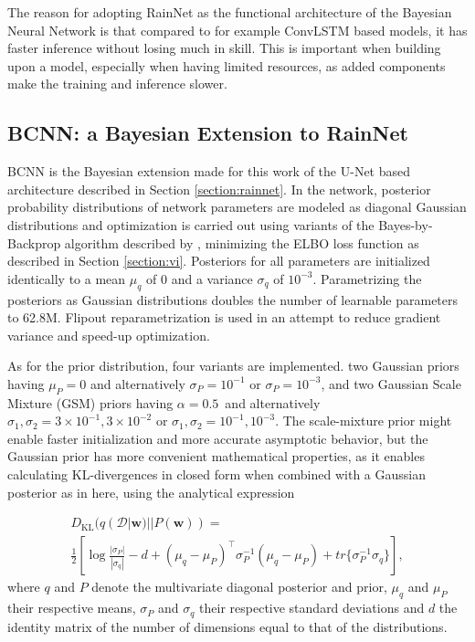 The reason for adopting RainNet as the functional architecture of the Bayesian Neural Network is that compared to for example ConvLSTM based models, it has faster inference without losing much in skill. This is important when building upon a model, especially when having limited resources, as added components make the training and inference slower. 


\subsection{BCNN: a Bayesian Extension to RainNet}

\label{section:bcnn}

BCNN is the Bayesian extension made for this work of the U-Net based architecture described in Section \ref{section:rainnet}. In the network, posterior probability distributions of network parameters are modeled as diagonal Gaussian distributions and optimization is carried out using variants of the Bayes-by-Backprop algorithm described by \citet{blundell_weight_2015}, minimizing the ELBO loss function as described in Section \ref{section:vi}. Posteriors for all parameters are initialized identically to a mean $\mu_q$ of 0 and a variance $\sigma_q$ of $10^{-3}$. Parametrizing the posteriors as Gaussian distributions doubles the number of learnable parameters to 62.8M. Flipout reparametrization \cite{wen_flipout_2018} is used in an attempt to reduce gradient variance and speed-up optimization. 

As for the prior distribution, four variants are implemented. two Gaussian priors having $\mu_P = 0$ and alternatively $\sigma_P = 10^{-1}$ or $\sigma_P = 10^{-3}$, and two Gaussian Scale Mixture (GSM) priors having $\alpha = 0.5$ and alternatively $\sigma_1, \sigma_2 = 3 \times 10^{-1}, 3 \times 10^{-2}$ or $\sigma_1, \sigma_2 = 10^{-1}, 10^{-3}$. The scale-mixture prior might enable faster initialization and more accurate asymptotic behavior, but the Gaussian prior has more convenient mathematical properties, as it enables calculating KL-divergences in closed form when combined with a Gaussian posterior as in here, using the analytical expression

\begin{multline}
D_{\text{KL}}(q(\mathcal{D}|\pmb{w}) || P(\pmb{w})) =\\
\frac{1}{2}\left[\log \frac{|\sigma_P|}{|\sigma_q|}
- d 
+ (\mu_q - \mu_P)^\top \sigma_P^{-1}(\mu_q - \mu_P)
+ tr\{\sigma_P^{-1}\sigma_q\}
\right],
\end{multline}
%
where $q$ and $P$ denote the multivariate diagonal posterior and prior, $\mu_q$ and $\mu_P$ their respective means, $\sigma_P$ and $\sigma_q$ their respective standard deviations and  $d$ the identity matrix of the number of dimensions equal to that of the distributions. 

